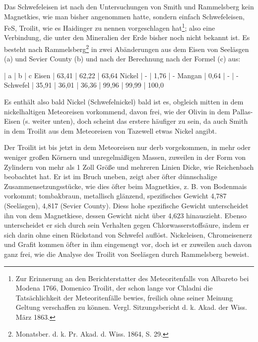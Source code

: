 \documentclass[a4paper, 11pt, oneside]{article}
\begin{document}
Das Schwefeleisen ist nach den Untersuchungen von Smith und Rammelsberg kein Magnetkies, wie man bisher angenommen hatte, sondern einfach Schwefeleisen, FeS, Troilit, wie es Haidinger zu nennen vorgeschlagen hat\footnote{Zur Erinnerung an den Berichterstatter des Meteoritenfalls von Albareto bei Modena 1766, Domenico Troilit, der schon lange vor Chladni die Tatsächlichkeit der Meteoritenfälle bewies, freilich ohne seiner Meinung Geltung verschaffen zu können. Vergl. Sitzungsbericht d. k. Akad. der Wiss. März 1863.}; also eine Verbindung, die unter den Mineralien der Erde bisher noch nicht bekannt ist. Es besteht nach Rammelsberg\footnote{Monatsber. d. k. Pr. Akad. d. Wiss. 1864, S. 29.} in zwei Abänderungen aus dem Eisen von Seeläsgen (a) und Sevier County (b) und nach der Berechnung nach der Formel (c) aus:

 | a | b | c  
Eisen | 63,41 | 62,22 | 63,64  
Nickel | - | 1,76 | -  
Mangan | 0,64 | - | -  
Schwefel | 35,91 | 36,01 | 36,36  
 | 99,96 | 99,99 | 100,0  

Es enthält also bald Nickel (Schwefelnickel) bald ist es, obgleich mitten in dem nickelhaltigen Meteoreisen vorkommend, davon frei, wie der Olivin in dem Pallas-Eisen (s. weiter unten), doch scheint das erstere häufiger zu sein, da auch Smith in dem Troilit aus dem Meteoreisen von Tazewell etwas Nickel angibt. 

Der Troilit ist bis jetzt in dem Meteoreisen nur derb vorgekommen, in mehr oder weniger großen Körnern und unregelmäßigen Massen, zuweilen in der Form von Zylindern von mehr als 1 Zoll Größe und mehreren Linien Dicke, wie Reichenbach beobachtet hat. Er ist im Bruch uneben, zeigt aber öfter dünnschalige Zusammensetzungsstücke, wie dies öfter beim Magnetkies, z. B. von Bodenmais vorkommt; tombakbraun, metallisch glänzend, spezifisches Gewicht 4,787 (Seeläsgen), 4,817 (Sevier County). Diess hohe spezifische Gewicht unterscheidet ihn von dem Magnetkiese, dessen Gewicht nicht über 4,623 hinauszieht. Ebenso unterscheidet er sich durch sein Verhalten gegen Chlorwasserstoffsäure, indem er sich darin ohne einen Rückstand von Schwefel auflöst. Nickeleisen, Chromeisenerz und Grafit kommen öfter in ihm eingemengt vor, doch ist er zuweilen auch davon ganz frei, wie die Analyse des Troilit von Seeläsgen durch Rammelsberg beweist.
\end{document}
